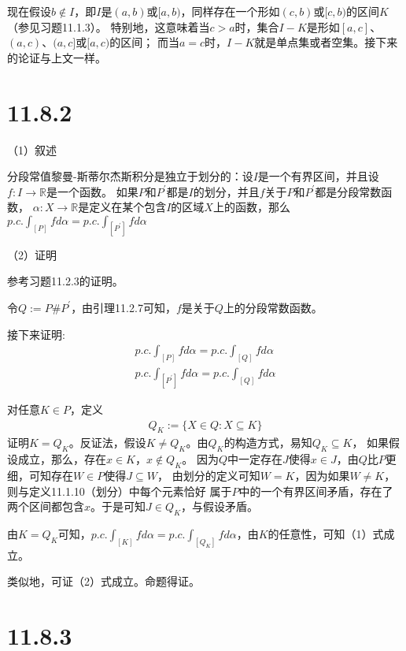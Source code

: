 \documentclass{article}
\begin{document}
现在假设$b \notin I$，即$I$是$(a, b)$或$[a, b)$，同样存在一个形如$(c, b)$或$[c, b)$的区间$K$（参见习题11.1.3）。
        特别地，这意味着当$c > a$时，集合$I - K$是形如$[a, c]$、$(a, c)$、$(a, c]$或$[a, c)$的区间；
        而当$a = c$时，$I - K$就是单点集或者空集。接下来的论证与上文一样。

        \section*{11.8.2}
        （1）叙述

        分段常值黎曼-斯蒂尔杰斯积分是独立于划分的：设$I$是一个有界区间，并且设$f: I \to \mathbb{R}$是一个函数。
        如果$P$和$P^\prime$都是$I$的划分，并且$f$关于$P$和$P^\prime$都是分段常数函数，
      $\alpha: X \to \mathbb{R}$是定义在某个包含$I$的区域$X$上的函数，那么
      $p.c.\int_{[P]} f d\alpha = p.c.\int_{[P^\prime]} f d\alpha$

        （2）证明

        参考习题11.2.3的证明。

        令$Q := P \# P^\prime$，由引理11.2.7可知，$f$是关于$Q$上的分段常数函数。

        接下来证明:
        \begin{align}
          p.c.\int_{[P]} f d\alpha = p.c.\int_{[Q]}f d\alpha \\
          p.c.\int_{[P^\prime]} f d\alpha = p.c.\int_{[Q]}f d\alpha
        \end{align}

        对任意$K \in P$，定义
        \begin{align*}
          Q_K := \{X \in Q : X \subseteq K\}
        \end{align*}
        证明$K = Q_K$。反证法，假设$K \neq Q_K$。由$Q_K$的构造方式，易知$Q_K \subseteq K$，
        如果假设成立，那么，存在$x \in K$，$x \notin Q_K$。
        因为$Q$中一定存在$J$使得$x \in J$，由$Q$比$P$更细，可知存在$W \in P$使得$J \subseteq W$，
        由划分的定义可知$W = K$，因为如果$W \neq K$，则与定义11.1.10（划分）中每个元素恰好
        属于$P$中的一个有界区间矛盾，存在了两个区间都包含$x$。于是可知$J \in Q_K$，与假设矛盾。

        由$K = Q_K$可知，$p.c.\int_{[K]} f d\alpha= p.c.\int_{[Q_K]}f d\alpha$，由$K$的任意性，可知（1）式成立。

        类似地，可证（2）式成立。命题得证。

        \section*{11.8.3}
\end{document}
